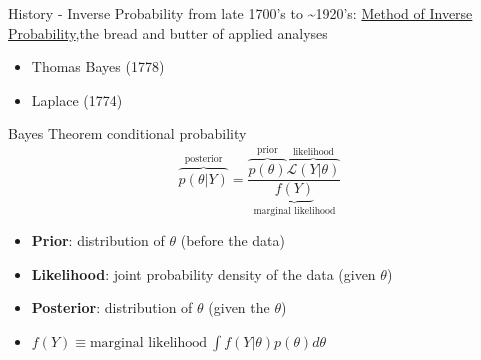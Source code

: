 \documentclass[presentation,9pt,xcolor=dvipsnames]{beamer}
\begin{document}
\begin{frame}[label={sec:org4692681}]{History - Inverse Probability}
from late 1700's to \textasciitilde{}1920's: \uline{Method of Inverse Probability},the bread and butter of applied analyses
\begin{itemize}
\item Thomas Bayes (1778)
\item Laplace (1774)
\end{itemize}
\begin{block}{Bayes Theorem}
conditional probability
\begin{equation}
\overbrace{p(\theta\vert Y)}^{\text{posterior}} = \frac{\overbrace{p(\theta)}^{\text{prior}}\overbrace{\mathcal{L}(Y\vert \theta)}^{\text{likelihood}}}{\underbrace{f(Y)}_{\text{marginal likelihood}}} 
\end{equation}
\begin{itemize}
\item \textbf{Prior}: distribution of \(\theta\) (before the data)
\item \textbf{Likelihood}: joint probability density of the data (given \(\theta\))
\item \textbf{Posterior}: distribution of \(\theta\) (given the \(\theta\))
\item \(f(Y)\equiv \text{marginal likelihood}\ \int f(Y\vert\theta)p(\theta) d \theta\)
\end{itemize}
\end{block}
\end{frame}
\end{document}
